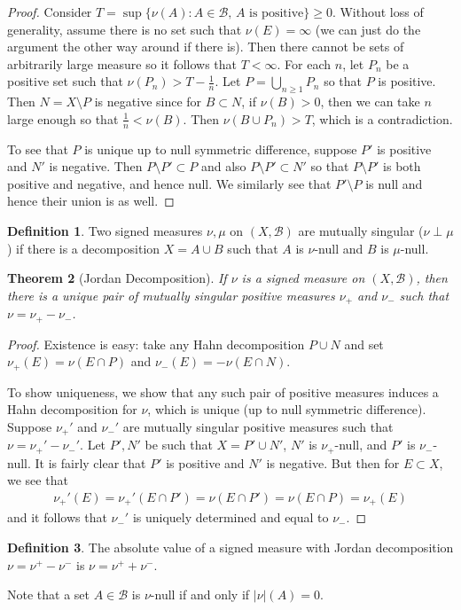 \documentclass[11pt]{amsart}
\newtheorem{theorem}{Theorem}[section]
\theoremstyle{definition}
\newtheorem{definition}[theorem]{Definition}
\numberwithin{equation}{section}
\begin{document}
\begin{proof}
    Consider $T=\sup\{\nu(A):A\in\mathcal B,\,A\text{ is positive}\}\ge 0$. Without loss of generality, assume there is no set such that $\nu(E)=\infty$ (we can just do the argument the other way around if there is). Then there cannot be sets of arbitrarily large measure so it follows that $T<\infty$. For each $n$, let $P_n$ be a positive set such that $\nu(P_n)>T-\frac{1}{n}$. Let $P=\bigcup_{n\ge 1}P_n$ so that $P$ is positive. Then $N=X\setminus P$ is negative since for $B\subset N$, if $\nu(B)>0$, then we can take $n$ large enough so that $\frac{1}{n}<\nu(B)$. Then $\nu(B\cup P_n)>T$, which is a contradiction.

    To see that $P$ is unique up to null symmetric difference, suppose $P'$ is positive and $N'$ is negative. Then $P\setminus P'\subset P$ and also $P\setminus P'\subset N'$ so that $P\setminus P'$ is both positive and negative, and hence null. We similarly see that $P'\setminus P$ is null and hence their union is as well.
\end{proof}
\begin{definition}
    Two signed measures $\nu,\mu$ on $(X,\mathcal B)$ are mutually singular ($\nu\perp \mu$) if there is a decomposition $X=A\cup B$ such that $A$ is $\nu$-null and $B$ is $\mu$-null.
\end{definition}
\begin{theorem}[Jordan Decomposition]
    If $\nu$ is a signed measure on $(X,\mathcal B)$, then there is a unique pair of mutually singular positive measures $\nu_+$ and $\nu_-$ such that $\nu=\nu_+-\nu_-$.
\end{theorem}
\begin{proof}
    Existence is easy: take any Hahn decomposition $P\cup N$ and set $\nu_+(E)=\nu(E\cap P)$ and $\nu_-(E)=-\nu(E\cap N)$.

    To show uniqueness, we show that any such pair of positive measures induces a Hahn decomposition for $\nu$, which is unique (up to null symmetric difference). Suppose $\nu_+'$ and $\nu_-'$ are mutually singular positive measures such that $\nu=\nu_+'-\nu_-'$. Let $P', N'$ be such that $X=P'\cup N'$, $N'$ is $\nu_+$-null, and $P'$ is $\nu_-$-null. It is fairly clear that $P'$ is positive and $N'$ is negative. But then for $E\subset X$, we see that 
    \begin{align*}
        \nu_+'(E)=\nu_+'(E\cap P')=\nu(E\cap P')=\nu(E\cap P)=\nu_+(E)
    \end{align*}
    and it follows that $\nu_-'$ is uniquely determined and equal to $\nu_-$.
\end{proof}
\begin{definition}
    The absolute value of a signed measure with Jordan decomposition $\nu=\nu^+-\nu^-$ is $\nu=\nu^++\nu^-$. 

    Note that a set $A\in\mathcal B$ is $\nu$-null if and only if $|\nu|(A)=0$.
\end{definition}
\end{document}
